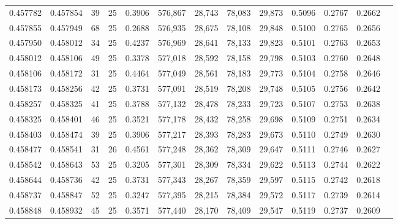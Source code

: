 \begin{tabular}{rrrrrrrrrrrrr}
0.457782 & 0.457854 &    39 &  25 &                                     0.3906 & 576,867 &  28,743 &  78,083 &  29,873 & 0.5096 & 0.2767 & 0.2662 \\
0.457855 & 0.457949 &    68 &  25 &                                     0.2688 & 576,935 &  28,675 &  78,108 &  29,848 & 0.5100 & 0.2765 & 0.2656 \\
0.457950 & 0.458012 &    34 &  25 &                                     0.4237 & 576,969 &  28,641 &  78,133 &  29,823 & 0.5101 & 0.2763 & 0.2653 \\
0.458012 & 0.458106 &    49 &  25 &                                     0.3378 & 577,018 &  28,592 &  78,158 &  29,798 & 0.5103 & 0.2760 & 0.2648 \\
0.458106 & 0.458172 &    31 &  25 &                                     0.4464 & 577,049 &  28,561 &  78,183 &  29,773 & 0.5104 & 0.2758 & 0.2646 \\
0.458173 & 0.458256 &    42 &  25 &                                     0.3731 & 577,091 &  28,519 &  78,208 &  29,748 & 0.5105 & 0.2756 & 0.2642 \\
0.458257 & 0.458325 &    41 &  25 &                                     0.3788 & 577,132 &  28,478 &  78,233 &  29,723 & 0.5107 & 0.2753 & 0.2638 \\
0.458325 & 0.458401 &    46 &  25 &                                     0.3521 & 577,178 &  28,432 &  78,258 &  29,698 & 0.5109 & 0.2751 & 0.2634 \\
0.458403 & 0.458474 &    39 &  25 &                                     0.3906 & 577,217 &  28,393 &  78,283 &  29,673 & 0.5110 & 0.2749 & 0.2630 \\
0.458477 & 0.458541 &    31 &  26 &                                     0.4561 & 577,248 &  28,362 &  78,309 &  29,647 & 0.5111 & 0.2746 & 0.2627 \\
0.458542 & 0.458643 &    53 &  25 &                                     0.3205 & 577,301 &  28,309 &  78,334 &  29,622 & 0.5113 & 0.2744 & 0.2622 \\
0.458644 & 0.458736 &    42 &  25 &                                     0.3731 & 577,343 &  28,267 &  78,359 &  29,597 & 0.5115 & 0.2742 & 0.2618 \\
0.458737 & 0.458847 &    52 &  25 &                                     0.3247 & 577,395 &  28,215 &  78,384 &  29,572 & 0.5117 & 0.2739 & 0.2614 \\
0.458848 & 0.458932 &    45 &  25 &                                     0.3571 & 577,440 &  28,170 &  78,409 &  29,547 & 0.5119 & 0.2737 & 0.2609 \\

\end{tabular}
